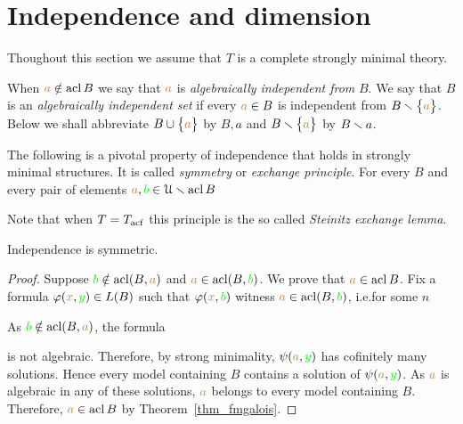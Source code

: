 \section{Independence and dimension}

Thoughout this section we assume that $T$ is a complete strongly minimal theory.  

When ${\color{brown} a}\notin\mathop{\rm acl} B$ we say that ${\color{brown} a}$ is \emph{algebraically independent from\/} $B$. We say that $B$ is an \emph{algebraically independent set\/} if every ${\color{brown} a}\in B$ is independent from $B\smallsetminus\big\{{\color{brown} a}\big\}$. Below we shall abbreviate $B\cup\big\{{\color{brown} a}\big\}$ by \emph{$B,a$} and  $B\smallsetminus\big\{{\color{brown} a}\big\}$ by \emph{$B\smallsetminus a$}. 

The following is a pivotal property of independence that holds in strongly minimal structures. It is called \emph{symmetry\/} or \emph{exchange principle}. For every $B$ and every pair of elements ${\color{brown} a},{\color{green} b}\in\EuScript U\smallsetminus\mathop{\rm acl} B$


Note that when $T=T_{\rm acf}$ this principle is the so called \emph{Steinitz exchange lemma}.

\begin{theorem}
Independence is symmetric.
\end{theorem} 

\begin{proof} 
Suppose ${\color{green} b}\notin\mathop{\rm acl}(B,{\color{brown} a})$ and ${\color{brown} a}\in\mathop{\rm acl}(B,{\color{green} b})$. We prove that ${\color{brown} a}\in\mathop{\rm acl} B$. Fix a formula $\varphi({\color{brown} x},{\color{green} y})\in L(B)$ such that $\varphi({\color{brown} x},{\color{green} b})$ witness ${\color{brown} a}\in\mathop{\rm acl}(B,{\color{green} b})$, i.e.\@ for some $n$


As ${\color{green} b}\notin\mathop{\rm acl}(B,{\color{brown} a})$, the formula


is not algebraic. Therefore, by strong minimality, $\psi({\color{brown} a},{\color{green} y})$ has cofinitely many solutions. Hence every model containing $B$ contains a solution of $\psi({\color{brown} a},{\color{green} y})$. As ${\color{brown} a}$ is algebraic in any of these solutions, ${\color{brown} a}$ belongs to every model containing $B$. Therefore, ${\color{brown} a}\in\mathop{\rm acl} B$ by Theorem~\ref{thm_fmgalois}.
\end{proof}

